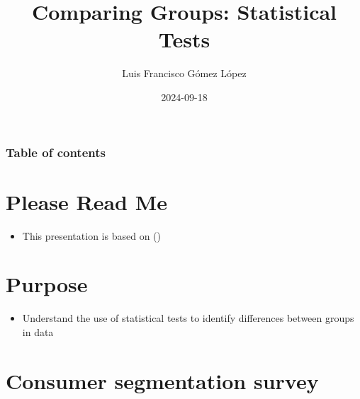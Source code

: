 \documentclass[
  ignorenonframetext,
]{beamer}
\title{Comparing Groups: Statistical Tests}
\author{Luis Francisco Gómez López}
\date{2024-09-18}
\institute{FAEDIS}
\providecommand{\tightlist}{%
  \setlength{\itemsep}{0pt}\setlength{\parskip}{0pt}}\usepackage{longtable,booktabs,array}
\renewcommand*\contentsname{Table of contents}
\newcommand\contentsname{Table of contents}
\begin{document}
\frame{\titlepage}

\renewcommand*\contentsname{Table of contents}
\begin{frame}[allowframebreaks]
  \frametitle{Table of contents}
  \tableofcontents[hideallsubsections]
\end{frame}

\section{Please Read Me}\label{please-read-me}

\begin{frame}{}
\label{section}
\begin{itemize}
\tightlist
\item
  This presentation is based on ()
\end{itemize}
\end{frame}

\section{Purpose}\label{purpose}

\begin{frame}{}
\label{section-1}
\begin{itemize}
\tightlist
\item
  Understand the use of statistical tests to identify differences
  between groups in data
\end{itemize}
\end{frame}

\section{Consumer segmentation
survey}\label{consumer-segmentation-survey}
\end{document}
